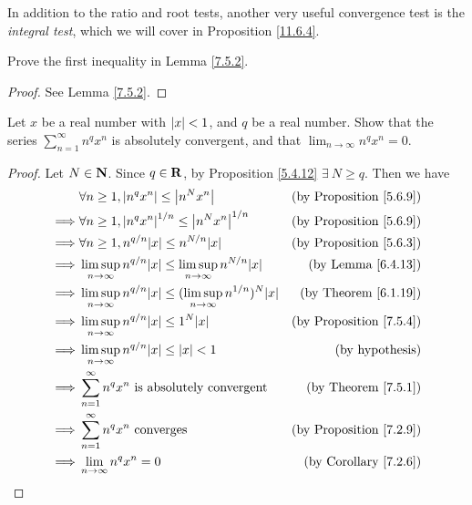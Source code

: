 \begin{remark}\label{7.5.5}
    In addition to the ratio and root tests, another very useful convergence test is the \emph{integral test}, which we will cover in Proposition \ref{11.6.4}.
\end{remark}

\exercisesection

\begin{exercise}\label{ex 7.5.1}
    Prove the first inequality in Lemma \ref{7.5.2}.
\end{exercise}

\begin{proof}
    See Lemma \ref{7.5.2}.
\end{proof}

\begin{exercise}\label{ex 7.5.2}
    Let \(x\) be a real number with \(\left\lvert x\right\rvert < 1\), and \(q\) be a real number.
    Show that the series \(\sum_{n = 1}^\infty n^q x^n\) is absolutely convergent, and that \(\lim_{n \to \infty} n^q x^n = 0\).
\end{exercise}

\begin{proof}
    Let \(N \in \mathbf{N}\).
    Since \(q \in \mathbf{R}\), by Proposition \ref{5.4.12} \(\exists\ N \geq q\).
    Then we have
    \begin{align*}
                 & \forall n \geq 1, \abs{n^q x^n} \leq \abs{n^N x^n}                                         & \text{(by Proposition \ref{5.6.9})} \\
        \implies & \forall n \geq 1, \abs{n^q x^n}^{1 / n} \leq \abs{n^N x^n}^{1 / n}                         & \text{(by Proposition \ref{5.6.9})} \\
        \implies & \forall n \geq 1, n^{q / n} \abs{x} \leq n^{N / n} \abs{x}                                 & \text{(by Proposition \ref{5.6.3})} \\
        \implies & \limsup_{n \to \infty} n^{q / n} \abs{x} \leq \limsup_{n \to \infty} n^{N / n} \abs{x}     & \text{(by Lemma \ref{6.4.13})}      \\
        \implies & \limsup_{n \to \infty} n^{q / n} \abs{x} \leq (\limsup_{n \to \infty} n^{1 / n})^N \abs{x} & \text{(by Theorem \ref{6.1.19})}    \\
        \implies & \limsup_{n \to \infty} n^{q / n} \abs{x} \leq 1^N \abs{x}                                  & \text{(by Proposition \ref{7.5.4})} \\
        \implies & \limsup_{n \to \infty} n^{q / n} \abs{x} \leq \abs{x} < 1                                  & \text{(by hypothesis)}              \\
        \implies & \sum_{n = 1}^\infty n^q x^n \text{ is absolutely convergent}                               & \text{(by Theorem \ref{7.5.1})}     \\
        \implies & \sum_{n = 1}^\infty n^q x^n \text{ converges}                                              & \text{(by Proposition \ref{7.2.9})} \\
        \implies & \lim_{n \to \infty} n^q x^n = 0                                                            & \text{(by Corollary \ref{7.2.6})}
    \end{align*}
\end{proof}

